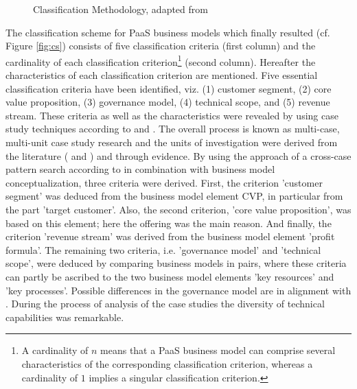 \begin{figure}[t]
	\centering
	
	\caption[Classification Methodology]{Classification Methodology, adapted from \citet[p. 44]{Fettke2003}}
	\label{fig:cm}
\end{figure}

The classification scheme for \ac{PaaS} business models which finally resulted (cf. Figure \ref{fig:cs}) consists of five classification criteria (first column) and the cardinality of each classification criterion\footnote{A cardinality of $n$ means that a \ac{PaaS} business model can comprise several characteristics of the corresponding classification criterion, whereas a cardinality of $1$ implies a singular classification criterion.} (second column). Hereafter the characteristics of each classification criterion are mentioned. Five essential classification criteria have been identified, viz. (1) customer segment, (2) core value proposition, (3) governance model, (4) technical scope, and (5) revenue stream. These criteria as well as the characteristics were revealed by using case study techniques according to \citet{Eisenhardt1989} and \citet{Yin2008}. The overall process is known as multi-case, multi-unit case study research \citep{Yin2008} and the units of investigation were derived from the literature (\citealp{Johnson2008} and \citealp{Tiwana2010}) and through evidence. By using the approach of a cross-case pattern search according to \citet{Eisenhardt1989} in combination with \citet{Johnson2008} business model conceptualization, three criteria were derived. First, the criterion 'customer segment' was deduced from the business model element \ac{CVP}, in particular from the part 'target customer'. Also, the second criterion, 'core value proposition', was based on this element; here the offering was the main reason. And finally, the criterion 'revenue stream' was derived from the business model element 'profit formula'. The remaining two criteria, i.e. 'governance model' and 'technical scope',  were deduced by comparing business models in pairs, where these criteria can partly be ascribed to the two business model elements 'key resources' and 'key processes'. Possible differences in the governance model are in alignment with \citet{Tiwana2010}. During the process of analysis of the case studies the diversity of technical capabilities was remarkable.

